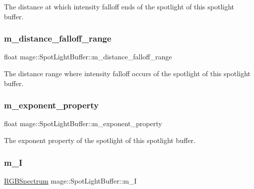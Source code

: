 The distance at which intensity falloff ends of the spotlight of this spotlight buffer. \hypertarget{structmage_1_1_spot_light_buffer_ad1f33d97b665093294fa0793bc7752f0}{}\label{structmage_1_1_spot_light_buffer_ad1f33d97b665093294fa0793bc7752f0} 
\subsubsection{\texorpdfstring{m\+\_\+distance\+\_\+falloff\+\_\+range}{m\_distance\_falloff\_range}}
{\footnotesize\ttfamily float mage\+::\+Spot\+Light\+Buffer\+::m\+\_\+distance\+\_\+falloff\+\_\+range}

The distance range where intensity falloff occurs of the spotlight of this spotlight buffer. \hypertarget{structmage_1_1_spot_light_buffer_a272cd27ceece27883b9607b8fff2160c}{}\label{structmage_1_1_spot_light_buffer_a272cd27ceece27883b9607b8fff2160c} 
\subsubsection{\texorpdfstring{m\+\_\+exponent\+\_\+property}{m\_exponent\_property}}
{\footnotesize\ttfamily float mage\+::\+Spot\+Light\+Buffer\+::m\+\_\+exponent\+\_\+property}

The exponent property of the spotlight of this spotlight buffer. \hypertarget{structmage_1_1_spot_light_buffer_a778a729e75ff4074fc5aede42f551ab2}{}\label{structmage_1_1_spot_light_buffer_a778a729e75ff4074fc5aede42f551ab2} 
\subsubsection{\texorpdfstring{m\+\_\+I}{m\_I}}
{\footnotesize\ttfamily \hyperlink{structmage_1_1_r_g_b_spectrum}{R\+G\+B\+Spectrum} mage\+::\+Spot\+Light\+Buffer\+::m\+\_\+I}

